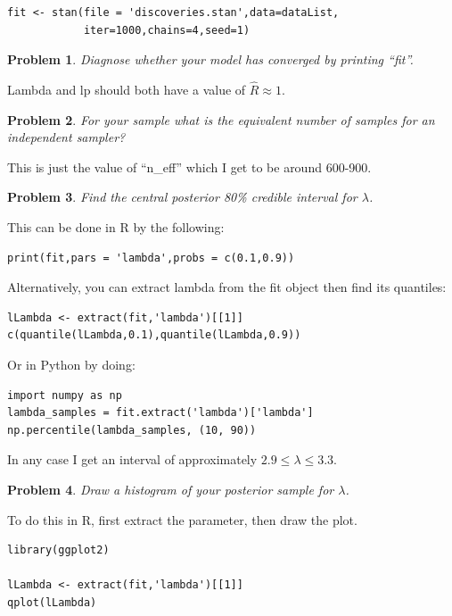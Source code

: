 \documentclass{article}
\newtheorem{problem}{Problem}[section]
\begin{document}
\begin{verbatim}
fit <- stan(file = 'discoveries.stan',data=dataList,
            iter=1000,chains=4,seed=1)
\end{verbatim}

\begin{problem}
Diagnose whether your model has converged by printing ``fit''.
\end{problem}

Lambda and lp should both have a value of $\hat{R}\approx 1$.

\begin{problem}
For your sample what is the equivalent number of samples for an independent sampler?
\end{problem}

This is just the value of ``n\_eff'' which I get to be around 600-900.

\begin{problem}
Find the central posterior 80\% credible interval for $\lambda$.
\end{problem}

This can be done in R by the following:

\begin{verbatim}
print(fit,pars = 'lambda',probs = c(0.1,0.9))
\end{verbatim}

Alternatively, you can extract lambda from the fit object then find its quantiles:

\begin{verbatim}
lLambda <- extract(fit,'lambda')[[1]]
c(quantile(lLambda,0.1),quantile(lLambda,0.9))
\end{verbatim}

Or in Python by doing:

\begin{verbatim}
import numpy as np
lambda_samples = fit.extract('lambda')['lambda']
np.percentile(lambda_samples, (10, 90))
\end{verbatim}

In any case I get an interval of approximately $2.9\leq\lambda\leq 3.3$.

\begin{problem}
	Draw a histogram of your posterior sample for $\lambda$.
\end{problem}

To do this in R, first extract the parameter, then draw the plot.

\begin{verbatim}
library(ggplot2)

lLambda <- extract(fit,'lambda')[[1]]
qplot(lLambda)
\end{verbatim}
\end{document}

